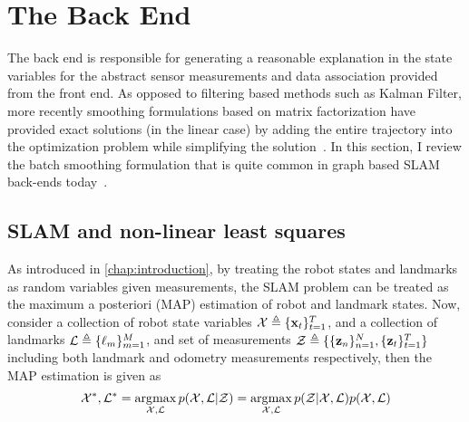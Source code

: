 \section{The Back End}

The back end is responsible for generating a reasonable explanation in the state variables for the abstract sensor measurements and data association provided from the front end. As opposed to filtering based methods such as Kalman Filter, more recently smoothing formulations based on matrix factorization have provided exact solutions (in the linear case) by adding the entire trajectory into the optimization problem while simplifying the solution~\cite{kaessIncrementalSmoothingMapping}. In this section, I review the batch smoothing formulation that is quite common in graph based SLAM back-ends today~\cite{grisettiTutorialGraphBasedSLAM, dellaertFactorGraphsRobot2017}.

\subsection{SLAM and non-linear least squares}

As introduced in \ref{chap:introduction}, by treating the robot states and landmarks as random variables given measurements, the SLAM problem can be treated as the maximum a posteriori (MAP) estimation of robot and landmark states. Now, consider a collection of robot state variables $\mathcal{X} \triangleq \{ \mathbf{x}_t \}_{t=1}^{T}$, and a collection of landmarks $\mathcal{L} \triangleq \{ \ell_m \}_{m=1}^{M}$, and set of measurements $\mathcal{Z} \triangleq \{\{\mathbf{z}_n \}_{n=1}^{N}, \{\mathbf{z}_t\}_{t=1}^{T}\}$ including both landmark and odometry measurements respectively, then the MAP estimation is given as
\begin{align}
    \mathcal{X}^*, \mathcal{L}^* = \operatorname*{\arg\!\max}_{\mathcal{X}, \mathcal{L}} p(\mathcal{X}, \mathcal{L} | \mathcal{Z}) = \operatorname*{\arg\!\max}_{\mathcal{X}, \mathcal{L}} p(\mathcal{Z} | \mathcal{X}, \mathcal{L}) p(\mathcal{X}, \mathcal{L}) \label{eq:2.1}
\end{align}

